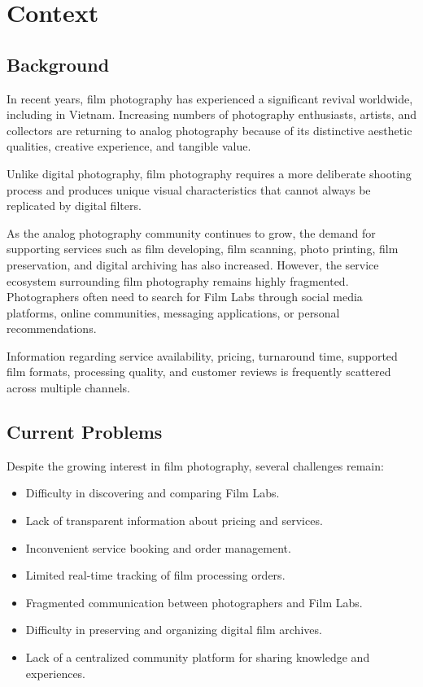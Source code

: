 
\section{Context}

\subsection{Background}

In recent years, film photography has experienced a significant revival worldwide, including in Vietnam. Increasing numbers of photography enthusiasts, artists, and collectors are returning to analog photography because of its distinctive aesthetic qualities, creative experience, and tangible value.

Unlike digital photography, film photography requires a more deliberate shooting process and produces unique visual characteristics that cannot always be replicated by digital filters.

As the analog photography community continues to grow, the demand for supporting services such as film developing, film scanning, photo printing, film preservation, and digital archiving has also increased. However, the service ecosystem surrounding film photography remains highly fragmented. Photographers often need to search for Film Labs through social media platforms, online communities, messaging applications, or personal recommendations.

Information regarding service availability, pricing, turnaround time, supported film formats, processing quality, and customer reviews is frequently scattered across multiple channels.

\subsection{Current Problems}

Despite the growing interest in film photography, several challenges remain:

\begin{itemize}
    \item Difficulty in discovering and comparing Film Labs.
    \item Lack of transparent information about pricing and services.
    \item Inconvenient service booking and order management.
    \item Limited real-time tracking of film processing orders.
    \item Fragmented communication between photographers and Film Labs.
    \item Difficulty in preserving and organizing digital film archives.
    \item Lack of a centralized community platform for sharing knowledge and experiences.
\end{itemize}


